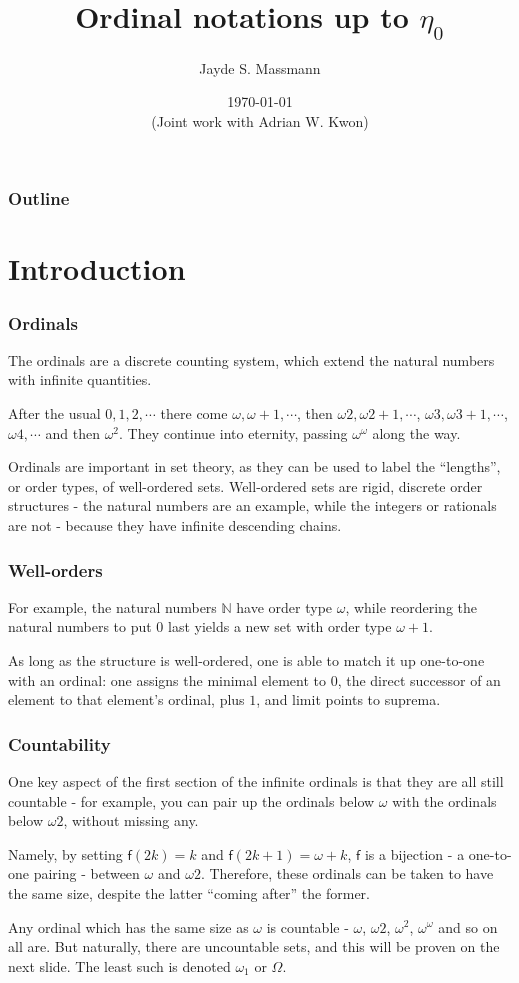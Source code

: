 \documentclass{beamer}
\title{Ordinal notations up to $\eta_0$}
\author{Jayde S. Massmann}
\date{\today \\ (Joint work with Adrian W. Kwon)}
\begin{document}
\frame{\titlepage}

\begin{frame}
\frametitle{Outline}
\tableofcontents
\end{frame}

\section{Introduction}

\begin{frame}
\frametitle{Ordinals}
The ordinals are a discrete counting system, which extend the natural numbers with infinite quantities.

\pause

After the usual $0, 1, 2, \cdots$ there come $\omega, \omega+1, \cdots$, then $\omega 2, \omega 2 + 1, \cdots$, $\omega 3, \omega 3 + 1, \cdots$, $\omega 4, \cdots$ and then $\omega^2$. \pause They continue into eternity, passing $\omega^\omega$ along the way.

\pause

Ordinals are important in set theory, as they can be used to label the ``lengths'', or \alert{order types}, of well-ordered sets. \pause  Well-ordered sets are rigid, discrete order structures - the natural numbers are an example, while the integers or rationals are not - because they have infinite descending chains.
\end{frame}

\begin{frame}
\frametitle{Well-orders}
For example, the natural numbers $\mathbb{N}$ have order type $\omega$, while reordering the natural numbers to put $0$ last yields a new set with order type $\omega + 1$.

\pause

As long as the structure is well-ordered, one is able to match it up one-to-one with an ordinal: one assigns the minimal element to $0$, the direct successor of an element to that element's ordinal, plus $1$, and limit points to suprema.
\end{frame}

\begin{frame}
\frametitle{Countability}
One key aspect of the first section of the infinite ordinals is that they are all still \alert{countable} - for example, you can pair up the ordinals below $\omega$ with the ordinals below $\omega 2$, without missing any. 

\pause

Namely, by setting $\mathsf{f}(2k) = k$ and $\mathsf{f}(2k+1) = \omega + k$, $\mathsf{f}$ is a bijection - a one-to-one pairing - between $\omega$ and $\omega 2$. Therefore, these ordinals can be taken to have the same size, despite the latter ``coming after'' the former.

\pause

Any ordinal which has the same size as $\omega$ is countable - $\omega$, $\omega 2$, $\omega^2$, $\omega^\omega$ and so on all are. But naturally, there are uncountable sets, and this will be proven on the next slide. The least such is denoted $\omega_1$ or $\Omega$.
\end{frame}
\end{document}

